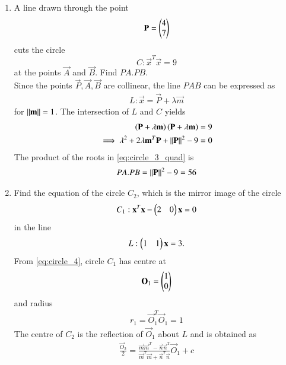 \documentclass[journal,12pt,twocolumn]{IEEEtran}
\begin{document}
\begin{enumerate}[label=\arabic*]
\item A line drawn through the point 
\begin{equation}
\label{eq:circle_3_p}
\mathbf{P} = \begin{pmatrix}4\\7\end{pmatrix} 
\end{equation}
cuts the circle
\begin{equation}
\label{eq:circle_3}
C: \vec{x}^T\vec{x}  = 9
\end{equation}
at the points $\vec{A}$ and $\vec{B}$. Find $PA.PB$.
\\
\solution Since the points $\vec{P},\vec{A},\vec{B}$ are collinear, the line $PAB$ can be expressed as
\begin{align}
L: \vec{x} = \vec{P} + \lambda \vec{m}
\label{eq:circle_3_pab}
\end{align}
%
for $\left\Vert\mathbf{m}\right\Vert = 1$. The intersection of $L$ and $C$  yields
\begin{align}
\left(\mathbf{P}+ \lambda \mathbf{m}\right)
\left(\mathbf{P} + \lambda \mathbf{m}\right) &= 9
\nonumber \\
\implies \lambda^2 + 2\lambda \mathbf{m}^T\mathbf{P} + \left\Vert\mathbf{P}\right\Vert^2-9 &= 0
\label{eq:circle_3_quad}
\end{align}
%
The product of the roots in \eqref{eq:circle_3_quad} is 
\begin{align}
\label{eq:circle_3_prod}
PA.PB =\left\Vert\mathbf{P}\right\Vert^2-9 = 56
\end{align}
%
\item Find the equation of the circle $C_2$, which is the mirror image of the circle
\begin{equation}
C_1: 
\mathbf{x}^T\mathbf{x} -\begin{pmatrix}2 & 0 \end{pmatrix}\mathbf{x} = 0
\label{eq:circle_4}
\end{equation}
in the line
\begin{equation}
L: \begin{pmatrix}1 & 1\end{pmatrix}\mathbf{x} = 3.
\label{eq:circle_4_line}
\end{equation}
\solution From  \eqref{eq:circle_4}, circle $C_1$ has centre at 
\begin{align}
\label{eq:circle_4_o1}
\mathbf{O}_1 = \begin{pmatrix}1 \\ 0 \end{pmatrix}
\end{align}
%
and radius 
\begin{align}
\label{eq:circle_4_r1}
r_1 = \vec{O}_1^T\vec{O}_1 = 1
\end{align}
%
The centre of $C_2$ is the reflection of $\vec{O}_1$ about $L$ and is obtained as 
\begin{align}
\label{eq:circle_4_o2}
\frac{\vec{O}_2}{2} = \frac{\vec{m}\vec{m}^T-\vec{n}\vec{n}^T}{\vec{m}^T\vec{m}+\vec{n}^T\vec{n}}\vec{O}_1 + c 

\end{align}
\end{enumerate}
\end{document}
